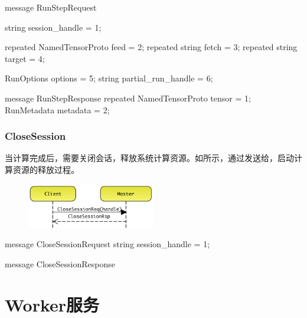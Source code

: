 \begin{content}
\begin{leftbar}
\begin{c++}
message RunStepRequest {
  string session_handle = 1;

  repeated NamedTensorProto feed = 2;
  repeated string fetch = 3;
  repeated string target = 4;

  RunOptions options = 5;
  string partial_run_handle = 6;
}

message RunStepResponse {
  repeated NamedTensorProto tensor = 1;
  RunMetadata metadata = 2;
}
\end{c++}
\end{leftbar}

\subsubsection{CloseSession}

当计算完成后，需要关闭会话，释放系统计算资源。如所示，通过发送给，启动计算资源的释放过程。

\begin{figure}[H]
\centering
\includegraphics[width=0.5\textwidth]{figures/dist-ms-closs-sess.png}
\caption{}
 \label{fig:dist-ms-closs-sess}
\end{figure}

\begin{leftbar}
\begin{c++}
message CloseSessionRequest {
  string session_handle = 1;
}

message CloseSessionResponse {
}
\end{c++}
\end{leftbar}

\end{content}

\section{Worker服务}

